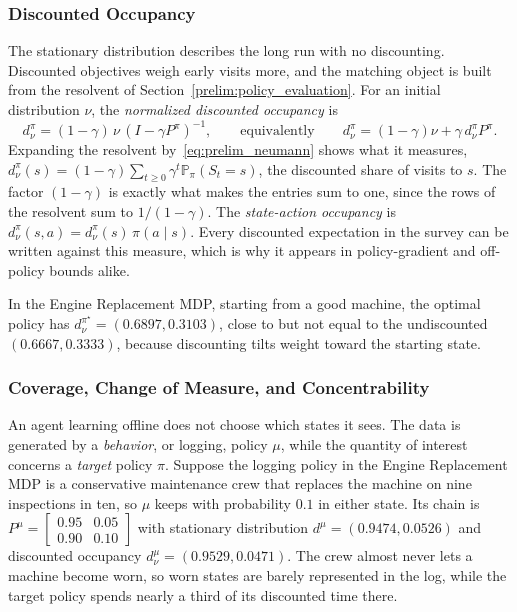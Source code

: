 \subsubsection{Discounted Occupancy}

The stationary distribution describes the long run with no discounting. Discounted objectives weigh early visits more, and the matching object is built from the resolvent of Section~\ref{prelim:policy_evaluation}. For an initial distribution $\nu$, the \emph{normalized discounted occupancy} is
\begin{equation}
d^\pi_\nu = (1-\gamma)\, \nu\, (I - \gamma P^\pi)^{-1},
\qquad \text{equivalently} \qquad
d^\pi_\nu = (1-\gamma)\nu + \gamma\, d^\pi_\nu P^\pi .
\label{eq:prelim_occupancy}
\end{equation}
Expanding the resolvent by~\eqref{eq:prelim_neumann} shows what it measures, $d^\pi_\nu(s) = (1-\gamma)\sum_{t \geq 0} \gamma^t \mathbb{P}_\pi(S_t = s)$, the discounted share of visits to $s$. The factor $(1-\gamma)$ is exactly what makes the entries sum to one, since the rows of the resolvent sum to $1/(1-\gamma)$. The \emph{state-action occupancy} is $d^\pi_\nu(s,a) = d^\pi_\nu(s)\,\pi(a \mid s)$. Every discounted expectation in the survey can be written against this measure, which is why it appears in policy-gradient and off-policy bounds alike.

In the Engine Replacement MDP, starting from a good machine, the optimal policy has $d^{\pi^\star}_\nu = (0.6897, 0.3103)$, close to but not equal to the undiscounted $(0.6667, 0.3333)$, because discounting tilts weight toward the starting state.

\subsubsection{Coverage, Change of Measure, and Concentrability}

An agent learning offline does not choose which states it sees. The data is generated by a \emph{behavior}, or logging, policy $\mu$, while the quantity of interest concerns a \emph{target} policy $\pi$. Suppose the logging policy in the Engine Replacement MDP is a conservative maintenance crew that replaces the machine on nine inspections in ten, so $\mu$ keeps with probability $0.1$ in either state. Its chain is $P^\mu = \left[\begin{smallmatrix} 0.95 & 0.05 \\ 0.90 & 0.10 \end{smallmatrix}\right]$ with stationary distribution $d^\mu = (0.9474, 0.0526)$ and discounted occupancy $d^\mu_\nu = (0.9529, 0.0471)$. The crew almost never lets a machine become worn, so worn states are barely represented in the log, while the target policy spends nearly a third of its discounted time there.

